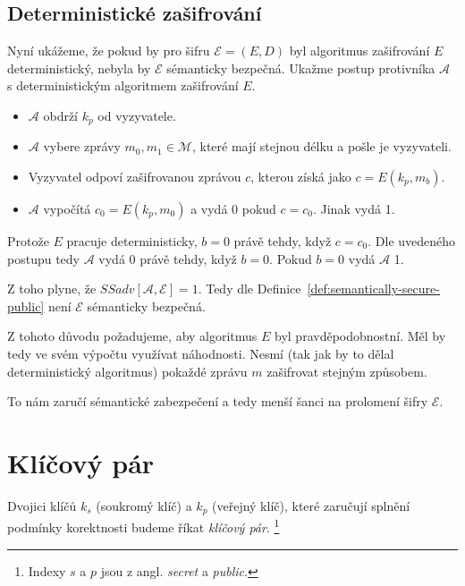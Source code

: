 \documentclass[
  program=infoi,
  biblatex,
  figures=false,
  glossaries,
  index
]{kidiplom}
\begin{document}
    \subsection{Deterministické zašifrování}
        
        Nyní ukážeme, že pokud by pro šifru $\mathcal{E} = (E, D)$ byl algoritmus zašifrování $E$ deterministický, nebyla by
        $\mathcal{E}$ sémanticky bezpečná.
        Ukažme postup protivníka $\mathcal{A}$ s deterministickým algoritmem zašifrování $E$.

        \begin{itemize}
            \item
                $\mathcal{A}$ obdrží $k_p$ od vyzyvatele.
            \item 
                $\mathcal{A}$ vybere zprávy $m_0, m_1 \in \mathcal{M}$, které mají stejnou délku a pošle je vyzyvateli.
            \item
                Vyzyvatel odpoví zašifrovanou zprávou $c$, kterou získá jako $c = E(k_p, m_b)$.
            \item
                $\mathcal{A}$ vypočítá $c_0 = E(k_p, m_0)$ a vydá 0 pokud $c = c_0$. Jinak vydá 1.
        \end{itemize}

        Protože $E$ pracuje deterministicky, $b = 0$ právě tehdy, když $c = c_0$.
        Dle uvedeného postupu tedy $\mathcal{A}$ vydá 0 právě tehdy, když $b = 0$.
        Pokud $b = 0$ vydá $\mathcal{A}$ 1.

        Z toho plyne, že $SSadv[\mathcal{A}, \mathcal{E}] = 1$.
        Tedy dle Definice~\ref{def:semantically-secure-public} není $\mathcal{E}$ sémanticky bezpečná.


    Z tohoto důvodu požadujeme, aby algoritmus $E$ byl pravděpodobnostní.
    Měl by tedy ve svém výpočtu využívat náhodnosti.
    Nesmí (tak jak by to dělal deterministický algoritmus) pokaždé zprávu $m$ zašifrovat stejným způsobem.
    
    To nám zaručí sémantické zabezpečení a tedy menší šanci na prolomení šifry $\mathcal{E}$.


\section{Klíčový pár}\label{sec:key-pair}

    Dvojici klíčů $k_s$ (soukromý klíč) a $k_p$ (veřejný klíč), které zaručují splnění podmínky korektnosti budeme říkat \emph{klíčový pár}.
    \footnote{Indexy $s$ a $p$ jsou z angl. \emph{secret} a \emph{public}.}
\end{document}
